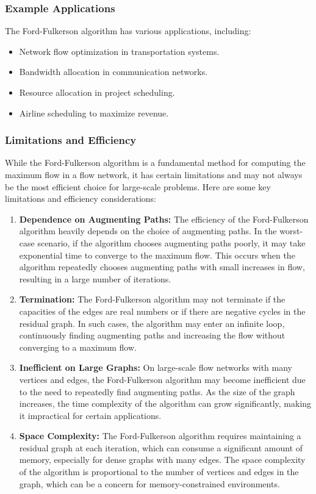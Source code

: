 \documentclass[12pt]{book} %
\begin{document}
\subsubsection{Example Applications}

The Ford-Fulkerson algorithm has various applications, including:

\begin{itemize}
    \item Network flow optimization in transportation systems.
    \item Bandwidth allocation in communication networks.
    \item Resource allocation in project scheduling.
    \item Airline scheduling to maximize revenue.
\end{itemize}

\subsubsection{Limitations and Efficiency}

While the Ford-Fulkerson algorithm is a fundamental method for computing the maximum flow in a flow network, it has certain limitations and may not always be the most efficient choice for large-scale problems. Here are some key limitations and efficiency considerations:

\begin{enumerate}
    \item \textbf{Dependence on Augmenting Paths:} The efficiency of the Ford-Fulkerson algorithm heavily depends on the choice of augmenting paths. In the worst-case scenario, if the algorithm chooses augmenting paths poorly, it may take exponential time to converge to the maximum flow. This occurs when the algorithm repeatedly chooses augmenting paths with small increases in flow, resulting in a large number of iterations.
    
    \item \textbf{Termination:} The Ford-Fulkerson algorithm may not terminate if the capacities of the edges are real numbers or if there are negative cycles in the residual graph. In such cases, the algorithm may enter an infinite loop, continuously finding augmenting paths and increasing the flow without converging to a maximum flow.
    
    \item \textbf{Inefficient on Large Graphs:} On large-scale flow networks with many vertices and edges, the Ford-Fulkerson algorithm may become inefficient due to the need to repeatedly find augmenting paths. As the size of the graph increases, the time complexity of the algorithm can grow significantly, making it impractical for certain applications.
    
    \item \textbf{Space Complexity:} The Ford-Fulkerson algorithm requires maintaining a residual graph at each iteration, which can consume a significant amount of memory, especially for dense graphs with many edges. The space complexity of the algorithm is proportional to the number of vertices and edges in the graph, which can be a concern for memory-constrained environments.
\end{enumerate}
\end{document}
